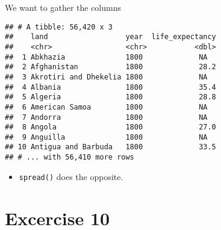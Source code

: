 \documentclass[]{book}
\newenvironment{Shaded}{\begin{snugshade}}{\end{snugshade}}
\newcommand{\DataTypeTok}[1]{\textcolor[rgb]{0.13,0.29,0.53}{#1}}
\newcommand{\KeywordTok}[1]{\textcolor[rgb]{0.13,0.29,0.53}{\textbf{#1}}}
\newcommand{\NormalTok}[1]{#1}
\newcommand{\OperatorTok}[1]{\textcolor[rgb]{0.81,0.36,0.00}{\textbf{#1}}}
\newcommand{\StringTok}[1]{\textcolor[rgb]{0.31,0.60,0.02}{#1}}
\providecommand{\tightlist}{%
  \setlength{\itemsep}{0pt}\setlength{\parskip}{0pt}}
\begin{document}
We want to gather the columns

\begin{Shaded}
\end{Shaded}

\begin{Shaded}
\end{Shaded}

\begin{verbatim}
## # A tibble: 56,420 x 3
##    land                  year  life_expectancy
##    <chr>                 <chr>           <dbl>
##  1 Abkhazia              1800             NA  
##  2 Afghanistan           1800             28.2
##  3 Akrotiri and Dhekelia 1800             NA  
##  4 Albania               1800             35.4
##  5 Algeria               1800             28.8
##  6 American Samoa        1800             NA  
##  7 Andorra               1800             NA  
##  8 Angola                1800             27.0
##  9 Anguilla              1800             NA  
## 10 Antigua and Barbuda   1800             33.5
## # ... with 56,410 more rows
\end{verbatim}

\begin{itemize}
\tightlist
\item
  \texttt{spread()} does the opposite.
\end{itemize}

\hypertarget{excercise-10}{%
\section{Excercise 10}\label{excercise-10}}
\end{document}

